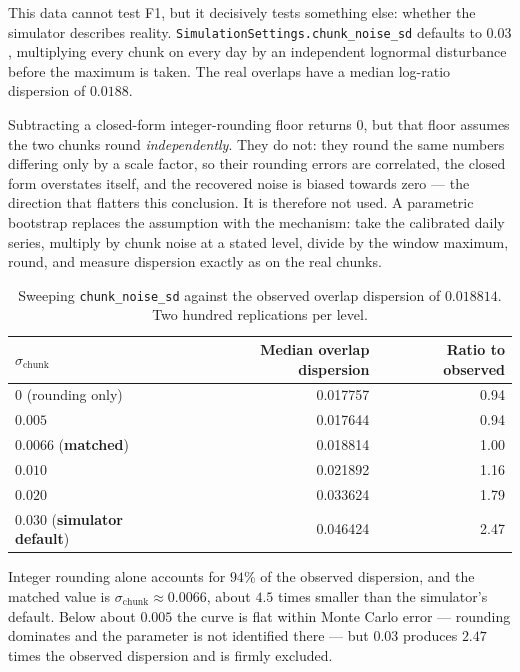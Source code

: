 \documentclass[12pt,a4paper,oneside]{article}
\begin{document}
This data cannot test F1, but it decisively tests something else: whether the
simulator describes reality. \texttt{SimulationSettings.\allowbreak chunk\_\allowbreak noise\_\allowbreak sd}
defaults to $0.03$, multiplying every chunk on every day by an independent
lognormal disturbance before the maximum is taken. The real overlaps have a
median log-ratio dispersion of $0.0188$.

Subtracting a closed-form integer-rounding floor returns $0$, but that floor
assumes the two chunks round \emph{independently}. They do not: they round the
same numbers differing only by a scale factor, so their rounding errors are
correlated, the closed form overstates itself, and the recovered noise is biased
towards zero --- the direction that flatters this conclusion. It is therefore not
used. A parametric bootstrap replaces the assumption with the mechanism: take the
calibrated daily series, multiply by chunk noise at a stated level, divide by the
window maximum, round, and measure dispersion exactly as on the real chunks.

\begin{table}[H]
\centering
\small
\caption{Sweeping \texttt{chunk\_\allowbreak noise\_\allowbreak sd} against the observed overlap
dispersion of $0.018814$. Two hundred replications per level.}
\label{tab:chunknoise}
\begin{tabular}{lrr}
\toprule
$\sigma_{\text{chunk}}$ & Median overlap dispersion & Ratio to observed\\
\midrule
$0$ (rounding only) & 0.017757 & 0.94\\
$0.005$ & 0.017644 & 0.94\\
$0.0066$ (\textbf{matched}) & 0.018814 & 1.00\\
$0.010$ & 0.021892 & 1.16\\
$0.020$ & 0.033624 & 1.79\\
$0.030$ (\textbf{simulator default}) & 0.046424 & 2.47\\
\bottomrule
\end{tabular}
\end{table}

Integer rounding alone accounts for $94\%$ of the observed dispersion, and the
matched value is $\sigma_{\text{chunk}}\approx 0.0066$, about $4.5$ times smaller
than the simulator's default. Below about $0.005$ the curve is flat within Monte
Carlo error --- rounding dominates and the parameter is not identified there ---
but $0.03$ produces $2.47$ times the observed dispersion and is firmly excluded.
\end{document}
